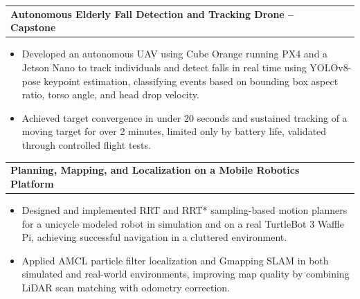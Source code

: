 \documentclass[letterpaper,11pt]{article}
\makeatletter
\newcommand{\resumeItem}[1]{
  \item\small{
    {#1 \vspace{-2.5pt}}
  }
}
\newcommand{\resumeProjectHeading}[2]{
    \item
    \begin{tabular*}{0.97\textwidth}{l@{\extracolsep{\fill}}r}
      \small#1 & #2 \\
    \end{tabular*}\vspace{-7pt}
}
\newcommand{\resumeItemListStart}{\begin{itemize}}
\newcommand{\resumeItemListEnd}{\end{itemize}\vspace{-5pt}}
\newcommand\z{-2.4pt}
\makeatother
\begin{document}
\resumeProjectHeading
      {\textbf{Autonomous Elderly Fall Detection and Tracking Drone -- Capstone}}{ }
      \resumeItemListStart
       \resumeItem{Developed an autonomous UAV using Cube Orange running PX4 and a Jetson Nano to track individuals and detect falls in real time using YOLOv8-pose keypoint estimation, classifying events based on bounding box aspect ratio, torso angle, and head drop velocity.}
        \resumeItem{Achieved target convergence in under 20 seconds and sustained tracking of a moving target for over 2 minutes, limited only by battery life, validated through controlled flight tests.}
      \resumeItemListEnd
\vspace{\z}

\resumeProjectHeading{\textbf{Planning, Mapping, and Localization on a Mobile Robotics Platform }}{ }
\resumeItemListStart
	\resumeItem{Designed and implemented RRT and RRT* sampling-based motion planners for a unicycle modeled robot in simulation and on a real TurtleBot 3 Waffle Pi, achieving successful navigation in a cluttered environment.}
	\resumeItem{Applied AMCL particle filter localization and Gmapping SLAM in both simulated and real-world environments, improving map quality by combining LiDAR scan matching with odometry correction.}
\resumeItemListEnd



\end{document}
